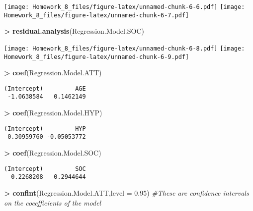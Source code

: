 \documentclass[]{article}
\newenvironment{Shaded}{\begin{snugshade}}{\end{snugshade}}
\newcommand{\KeywordTok}[1]{\textcolor[rgb]{0.13,0.29,0.53}{\textbf{#1}}}
\newcommand{\DataTypeTok}[1]{\textcolor[rgb]{0.13,0.29,0.53}{#1}}
\newcommand{\FloatTok}[1]{\textcolor[rgb]{0.00,0.00,0.81}{#1}}
\newcommand{\StringTok}[1]{\textcolor[rgb]{0.31,0.60,0.02}{#1}}
\newcommand{\CommentTok}[1]{\textcolor[rgb]{0.56,0.35,0.01}{\textit{#1}}}
\newcommand{\OperatorTok}[1]{\textcolor[rgb]{0.81,0.36,0.00}{\textbf{#1}}}
\newcommand{\NormalTok}[1]{#1}
\begin{document}
\texttt{[image: Homework\_8\_files/figure-latex/unnamed-chunk-6-6.pdf]}
\texttt{[image: Homework\_8\_files/figure-latex/unnamed-chunk-6-7.pdf]}

\begin{Shaded}
\begin{Highlighting}[]
\OperatorTok{>}\StringTok{ }\KeywordTok{residual.analysis}\NormalTok{(Regression.Model.SOC)}
\end{Highlighting}
\end{Shaded}

\texttt{[image: Homework\_8\_files/figure-latex/unnamed-chunk-6-8.pdf]}
\texttt{[image: Homework\_8\_files/figure-latex/unnamed-chunk-6-9.pdf]}

\begin{Shaded}
\begin{Highlighting}[]
\OperatorTok{>}\StringTok{ }\KeywordTok{coef}\NormalTok{(Regression.Model.ATT)}
\end{Highlighting}
\end{Shaded}

\begin{verbatim}
(Intercept)         AGE 
 -1.0638584   0.1462149 
\end{verbatim}

\begin{Shaded}
\begin{Highlighting}[]
\OperatorTok{>}\StringTok{ }\KeywordTok{coef}\NormalTok{(Regression.Model.HYP)}
\end{Highlighting}
\end{Shaded}

\begin{verbatim}
(Intercept)         HYP 
 0.30959760 -0.05053772 
\end{verbatim}

\begin{Shaded}
\begin{Highlighting}[]
\OperatorTok{>}\StringTok{ }\KeywordTok{coef}\NormalTok{(Regression.Model.SOC)}
\end{Highlighting}
\end{Shaded}

\begin{verbatim}
(Intercept)         SOC 
  0.2268208   0.2944644 
\end{verbatim}

\begin{Shaded}
\begin{Highlighting}[]
\OperatorTok{>}\StringTok{ }\KeywordTok{confint}\NormalTok{(Regression.Model.ATT,}\DataTypeTok{level =} \FloatTok{0.95}\NormalTok{) }\CommentTok{#These are confidence intervals on the coeefficients of the model}
\end{Highlighting}
\end{Shaded}
\end{document}
